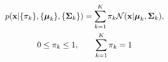 \documentclass[preview]{standalone}
\begin{document}
\begin{gather*}
  p(\vb{x} | \qty{ \pi_k }, \qty{ \vb*\mu_k }, \qty{ \vb*\Sigma_k }) =
  \sum_{k=1}^K \pi_k \mathcal{N}(\vb{x} | \vb*\mu_k, \vb*\Sigma_k),
  \\
  0 \leq \pi_k \leq 1, \qquad \sum_{k=1}^K \pi_k = 1
\end{gather*}
\end{document}
